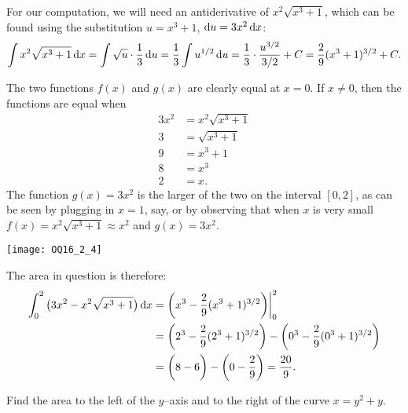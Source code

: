 \begin{solution}
For our computation, we will need an antiderivative of
$x^2\sqrt{x^3+1}$, which can be found using the substitution
$u=x^3+1$, $\mathrm{d}u = 3x^2\,\mathrm{d}x$:
\begin{align*}
\int x^2\sqrt{x^3+1} \, \mathrm{d}x = \int \sqrt u \cdot \frac13\,\mathrm{d}u = \frac13\int u^{1/2}\,\mathrm{d}u = \frac13\cdot \frac{u^{3/2}}{3/2}+C = \frac29(x^3+1)^{3/2} + C.
\end{align*}

The two functions $f(x)$ and $g(x)$ are clearly equal at $x=0$. If $x\ne0$, then the functions are equal when
\begin{align*}
3x^2 &= x^2\sqrt{x^3+1} \\
3 &= \sqrt{x^3+1} \\
9 &= x^3+1 \\
8 &= x^3 \\
2 &= x.
\end{align*}
The function $g(x)=3x^2$ is the larger of the two on the interval $[0,2]$, as can be seen by plugging in $x=1$, say, or by observing that when $x$
is very small $f(x)=x^2\sqrt{x^3+1}\approx x^2$ and $g(x)=3x^2$.

\begin{center}
     \texttt{[image: OQ16\_2\_4]}
\end{center}

The area in question is therefore:
\begin{align*}
\int_0^2 \big( 3x^2 - x^2\sqrt{x^3+1} \big) \, \mathrm{d}x &= \bigg( {x^3} - \frac29(x^3+1)^{3/2} \bigg) \bigg|_0^2 \\
&= \bigg( 2^3 - \frac2 9(2^3+1)^{3/2} \bigg) - \bigg( 0^3 - \frac29(0^3+1)^{3/2} \bigg) \\
&= \bigg( 8 - 6 \bigg) - \bigg( 0 - \frac 2 9 \bigg) =\frac{20}9.
\end{align*}
\end{solution}

\begin{Mquestion}[2016Q2]
Find the area to the left of the $y$--axis and to
the right of the curve $x=y^2+y$.
\end{Mquestion}

